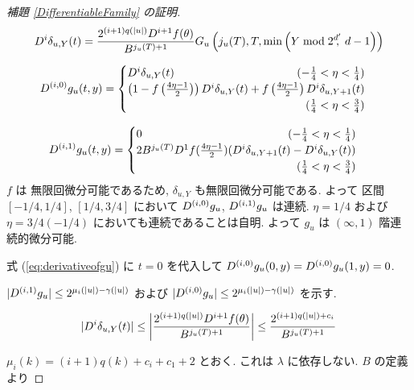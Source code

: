 \begin{proof}[\rm 補題 \ref{DifferentiableFamily} の証明]
  \begin{equation}
   D^i \delta_{u,Y}(t) 
    = \frac{2^{(i+1)q(|u|)} D^{i+1}f(\theta)}{B^{j_u(T)+1}}
    G_u\left( j_u(T), T, \min \left(Y \bmod 2^{d'}\!\!\!,\ d-1 \right) \right)
  \end{equation}

  \begin{equation}
   \label{eq:derivativeofgu}
    \D^{(i,0)} g_u(t, y)
     = \begin{cases}
	\D^i \delta_{u, Y}(t) 
	\hfill (- \frac 1 4 < \eta < \frac 1 4) \\
	\left( 1-f \left(\frac{4\eta-1}{2}\right)\right) 
	\D^i \delta_{u, Y}(t) 
	+ f \left(\frac{4\eta-1}{2}\right) \D^i \delta_{u,Y+1}(t) \\
	\hfill (\frac 1 4 < \eta < \frac 3 4)
       \end{cases}
  \end{equation}   

  \begin{equation}
    \D^{(i,1)} g_u(t, y)
     = \begin{cases}
	0 \hfill (- \frac 1 4 < \eta < \frac 1 4) \\
	2B^{j_u(T)}\D^{1}f(\frac{4\eta - 1}2)
	(\D^i \delta_{u,Y+1}(t)-\D^i \delta_{u, Y}(t)) \\
	\hfill (\frac 1 4 < \eta < \frac 3 4)
       \end{cases}
  \end{equation}
  $f$ は 無限回微分可能であるため, $\delta_{u,Y}$ も無限回微分可能である.
  よって 区間 $[-1/4, 1/4]$, $[1/4, 3/4]$ において
  $D^{(i,0)} g_u$, $D^{(i,1)} g_u$ は連続. 
  $\eta = 1/4$ および  $\eta = 3/4(-1/4)$ においても連続であることは自明.
  よって $g_u$ は $(\infty, 1)$ 階連続的微分可能.

  式 (\ref{eq:derivativeofgu}) に $t = 0$ を代入して
  $D^{(i, 0)} g_u(0,y) = D^{(i, 0)} g_u(1,y) = 0$.

  $|D^{(i,1)} g_u| \leq 2^{\mu_i (|u|) - \gamma(|u|)}$ および
  $|D^{(i,0)} g_u| \leq 2^{\mu_i (|u|) - \gamma(|u|)}$ を示す.

  \begin{equation}
   |D^i \delta_{u, Y}(t)| 
    \le \left|\frac{2^{(i+1)q(|u|)}D^{i+1}f(\theta)}{B^{j_u(T)+1}} \right|
    \le \frac{2^{(i+1)q(|u|) + c_i}}{B^{j_u(T)+1}}\\
  \end{equation}

  $\mu_i(k) = (i+1)q(k) + c_i + c_1 + 2$ とおく.
  これは $\lambda$ に依存しない.
  $B$ の定義より


\end{proof}
